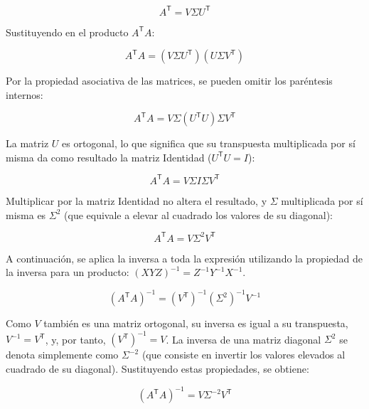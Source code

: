 \documentclass[11pt,a4paper]{article}
\newcommand{\trans}{\mathsf{T}}      %
\begin{document}
\begin{equation}
    A^{\trans} = V \Sigma U^{\trans}
\end{equation}

Sustituyendo en el producto \(A^{\trans} A\):

\begin{equation}
    A^{\trans} A = (V \Sigma U^{\trans}) (U \Sigma V^{\trans})
\end{equation}

Por la propiedad asociativa de las matrices, se pueden omitir los paréntesis internos:

\begin{equation}
    A^{\trans} A = V \Sigma (U^{\trans} U) \Sigma V^{\trans}
\end{equation}

La matriz \(U\) es ortogonal, lo que significa que su transpuesta multiplicada por sí misma da como resultado la matriz Identidad (\(U^{\trans} U = I\)):

\begin{equation}
    A^{\trans} A = V \Sigma I \Sigma V^{\trans}
\end{equation}

Multiplicar por la matriz Identidad no altera el resultado, y \(\Sigma\) multiplicada por sí misma es \(\Sigma^2\) (que equivale a elevar al cuadrado los valores de su diagonal):

\begin{equation}
    A^{\trans} A = V \Sigma^2 V^{\trans}
\end{equation}

A continuación, se aplica la inversa a toda la expresión utilizando la propiedad de la inversa para un producto: \((X Y Z)^{-1} = Z^{-1} Y^{-1} X^{-1}\).

\begin{equation}
    (A^{\trans} A)^{-1} = (V^{\trans})^{-1} (\Sigma^2)^{-1} V^{-1}
\end{equation}

Como \(V\) también es una matriz ortogonal, su inversa es igual a su transpuesta, \(V^{-1} = V^{\trans}\), y, por tanto, \((V^{\trans})^{-1} = V\). La inversa de una matriz diagonal \(\Sigma^2\) se denota simplemente como \(\Sigma^{-2}\) (que consiste en invertir los valores elevados al cuadrado de su diagonal). Sustituyendo estas propiedades, se obtiene:

\begin{equation}
    (A^{\trans} A)^{-1} = V \Sigma^{-2} V^{\trans}
\end{equation}
\end{document}

